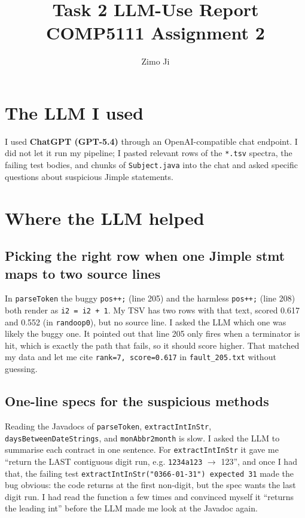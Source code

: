\documentclass[manuscript,review,nonacm]{acmart}
\title{Task 2 \textendash{} LLM-Use Report\\
       \large COMP5111 Assignment 2}
\author{Zimo Ji}
\affiliation{\institution{HKUST}\city{Hong Kong}\country{Hong Kong SAR}}
\begin{document}
\maketitle
\thispagestyle{plain}

\section{The LLM I used}
I used \textbf{ChatGPT (GPT-5.4)} through an OpenAI-compatible chat
endpoint. I did not let it run my pipeline; I pasted relevant rows of
the \texttt{*.tsv} spectra, the failing test bodies, and chunks of
\texttt{Subject.java} into the chat and asked specific questions about
suspicious Jimple statements.

\section{Where the LLM helped}

\subsection{Picking the right row when one Jimple stmt maps to two
source lines}
In \texttt{parseToken} the buggy \texttt{pos++;} (line 205) and the
harmless \texttt{pos++;} (line 208) both render as
\texttt{i2 = i2 + 1}. My TSV has two rows with that text, scored
0.617 and 0.552 (in \texttt{randoop0}), but no source line. I asked
the LLM which one was likely the buggy one. It pointed out that line
205 only fires when a terminator is hit, which is exactly the path
that fails, so it should score higher. That matched my data and let
me cite \texttt{rank=7, score=0.617} in \texttt{fault\_205.txt}
without guessing.

\subsection{One-line specs for the suspicious methods}
Reading the Javadocs of \texttt{parseToken}, \texttt{extractIntInStr},
\texttt{daysBetweenDateStrings}, and \texttt{monAbbr2month} is slow.
I asked the LLM to summarise each contract in one sentence. For
\texttt{extractIntInStr} it gave me ``return the LAST contiguous digit
run, e.g. \texttt{1234a123} $\to$ 123'', and once I had that, the
failing test
\texttt{extractIntInStr("0366-01-31") expected 31} made the bug
obvious: the code returns at the first non-digit, but the spec wants
the last digit run. I had read the function a few times and convinced
myself it ``returns the leading int'' before the LLM made me look at
the Javadoc again.
\end{document}
